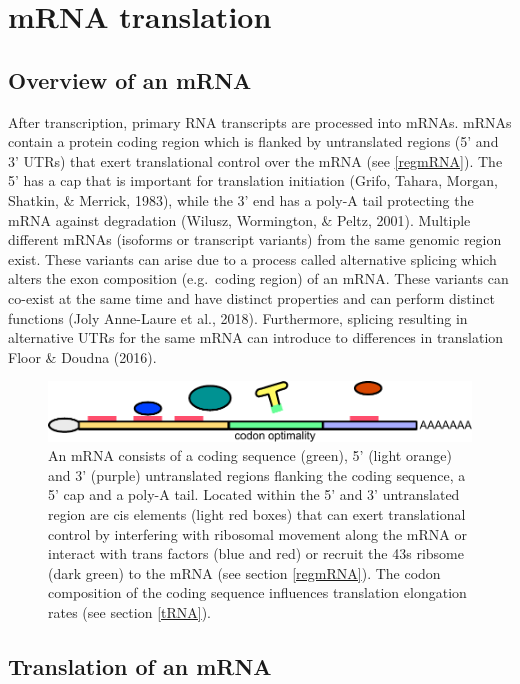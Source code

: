 \documentclass[
  12pt,
  openany]{book}
\begin{document}
\section{mRNA translation}
\subsection{Overview of an mRNA}

After transcription, primary RNA transcripts are processed into mRNAs. mRNAs contain a protein coding region which is flanked by untranslated regions (5' and 3' UTRs) that exert translational control over the mRNA (see \ref{regmRNA}). The 5' has a cap that is important for translation initiation (Grifo, Tahara, Morgan, Shatkin, \& Merrick, 1983), while the 3' end has a poly-A tail protecting the mRNA against degradation (Wilusz, Wormington, \& Peltz, 2001). Multiple different mRNAs (isoforms or transcript variants) from the same genomic region exist. These variants can arise due to a process called alternative splicing which alters the exon composition (e.g.~coding region) of an mRNA. These variants can co-exist at the same time and have distinct properties and can perform distinct functions (Joly Anne-Laure et al., 2018). Furthermore, splicing resulting in alternative UTRs for the same mRNA can introduce to differences in translation Floor \& Doudna (2016).

\begin{figure}
  \includegraphics{./figures/UTRFeatures.pdf}
  \caption{ An mRNA consists of a coding sequence (green), 5' (light orange) and 3' (purple) untranslated regions flanking the coding sequence, a 5' cap and a poly-A tail. Located within the 5' and 3' untranslated region are cis elements (light red boxes) that can exert translational control by interfering with ribosomal movement along the mRNA or interact with trans factors (blue and red) or recruit the 43s ribsome (dark green) to the mRNA (see section \ref{regmRNA}). The codon composition of the coding sequence influences translation elongation rates (see section \ref{tRNA}).   
 \label{fig:UTRFeat}}
\end{figure}
\clearpage
\subsection{Translation of an mRNA}
\end{document}
